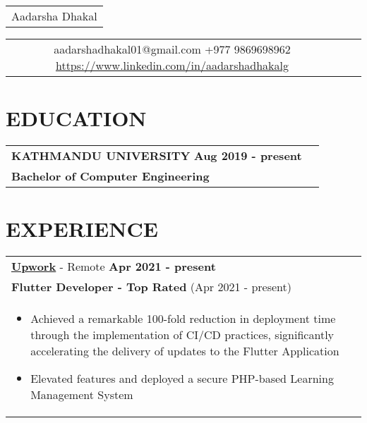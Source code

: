 \documentclass[a4paper,8pt]{article}
\begin{document}
\pagestyle{empty} 

\begin{tabularx}{\linewidth}{@{} C @{}}
\Huge{Aadarsha Dhakal} \\[6pt]
\end{tabularx}

\begin{tabularx}{\linewidth}{@{} C @{} C @{} C}
{{\raisebox{-0.05\height}{\faEnvelope} aadarshadhakal01@gmail.com}} 
{{\raisebox{-0.05\height}{\faMobile} +977 9869698962}} 
{{\href{https://www.linkedin.com/in/aadarshadhakalg}{\raisebox{-0.05\height}{\faLinkedin} https://www.linkedin.com/in/aadarshadhakalg}}}
\end{tabularx}

\section{\textbf{EDUCATION}}
\begin{tabularx}{\linewidth}{ @{}l r@{}}
\textbf{KATHMANDU UNIVERSITY} \hfill \textbf{Aug 2019 - present} \\[4pt]
\textbf{Bachelor of Computer Engineering}\\[4pt]
\end{tabularx}

\section{\textbf{EXPERIENCE}}
\begin{tabularx}{\linewidth}{ @{}l r@{} }
\textbf{\underline{\href{https://www.upwork.com/freelancers/~01c6b4be63acb73e89}{Upwork}}} - Remote \hfill \textbf{Apr 2021 - present} \\[4pt]
\textbf{Flutter Developer - Top Rated} (Apr 2021 - present) \\[4pt]
\begin{minipage}[t]{\linewidth}
    \begin{itemize}[nosep,after=\strut, leftmargin=1em, itemsep=2pt]
        \item Achieved a remarkable 100-fold reduction in deployment time through the implementation of CI/CD practices, significantly accelerating the delivery of updates to the Flutter Application
        \item Elevated features and deployed a secure PHP-based Learning Management System
    \end{itemize}
\end{minipage}
\end{tabularx}
\end{document}
